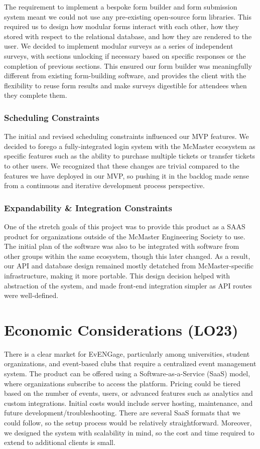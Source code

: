 \documentclass{article}
\begin{document}
The requirement to implement a bespoke form builder and form submission system
meant we could not use any pre-existing open-source form libraries. This
required us to design how modular forms interact with each other, how they
stored with respect to the relational database, and how they are rendered to the
user. We decided to implement modular surveys as a series of independent
surveys, with sections unlocking if necessary based on specific responses or the
completion of previous sections. This ensured our form builder was meaningfully
different from existing form-building software, and provides the client with the
flexibility to reuse form results and make surveys digestible for attendees when
they complete them.

\subsubsection{Scheduling Constraints}
The initial and revised scheduling constraints influenced our MVP features. We
decided to forego a fully-integrated login system with the McMaster ecosystem as
specific features such as the ability to purchase multiple tickets or transfer
tickets to other users. We recognized that these changes are trivial compared to
the features we have deployed in our MVP, so pushing it in the backlog made sense
from a continuous and iterative development process perspective.

\subsubsection{Expandability \& Integration Constraints}
One of the stretch goals of this project was to provide this product as a SAAS
product for organizations outside of the McMaster Engineering Society to use.
The initial plan of the software was also to be integrated with software from
other groups within the same ecosystem, though this later changed. As a result,
our API and database design remained mostly detatched from McMaster-specific
infrastructure, making it more portable. This design decision helped with
abstraction of the system, and made front-end integration simpler as API routes
were well-defined.

\section{Economic Considerations (LO23)}

There is a clear market for EvENGage, particularly among universities, student organizations, and event-based clubs that require a centralized event management system. The product can be offered using a Software-as-a-Service (SaaS) model, where organizations subscribe to access the platform. Pricing could be tiered based on the number of events, users, or advanced features such as analytics and custom integrations. Initial costs would include server hosting, maintenance, and future development/troubleshooting. There are several SaaS formats that we could follow, so the setup process would be relatively straightforward. Moreover, we designed the system with scalability in mind, so the cost and time required to extend to additional clients is small.
\end{document}
